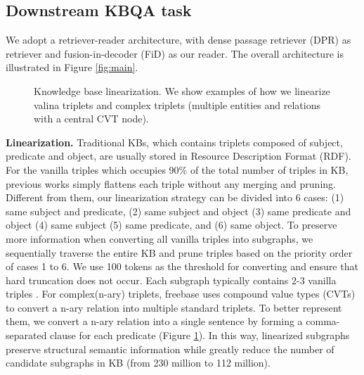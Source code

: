 \documentclass[sigconf,natbib=true,anonymous=False]{acmart}
\begin{document}
\subsection{Downstream KBQA task}
We adopt a retriever-reader architecture, with dense passage retriever (DPR) 
 \cite{karpukhin2020dense} as retriever and fusion-in-decoder (FiD) \cite{izacard2020leveraging} as our reader. The overall architecture is illustrated in Figure \ref{fig:main}.
\begin{figure}[t]
\centering

\caption{Knowledge base linearization. We show examples of how we linearize valina triplets and complex triplets (multiple entities and relations with a central CVT node).}
\vspace{-0.2cm} 
\label{fig:linear}
\vspace{-0.2cm} 
\end{figure}


\textbf{Linearization.} Traditional KBs, which contains triplets composed of subject, predicate and object, are usually stored in Resource Description Format (RDF). For the vanilla triples which occupies 90\% of the total number of triples in KB, previous works \cite{das2022knowledge,yan2021large,yu2022decaf} simply flattens each triple without any merging and pruning. Different from them, our linearization strategy can be divided into 6 cases: (1) same subject and predicate, (2) same subject and object (3) same predicate and object (4) same subject (5) same predicate, and (6) same object. To preserve more information when converting all vanilla triples into subgraphs, we sequentially traverse the entire KB and prune triples based on the priority order of cases 1 to 6. We use 100 tokens as the threshold for converting and ensure that hard truncation does not occur. Each subgraph typically contains 2-3 vanilla triples . For complex(n-ary) triplets, freebase uses compound value types (CVTs) to convert a n-ary relation into multiple standard triplets. To better represent them, we convert a n-ary relation into a single sentence by forming a comma-separated clause for each predicate (Figure \ref{fig:linear}). In this way, linearized subgraphs preserve structural semantic information while greatly reduce the number of candidate subgraphs in KB (from 230 million to 112 million).
\end{document}
